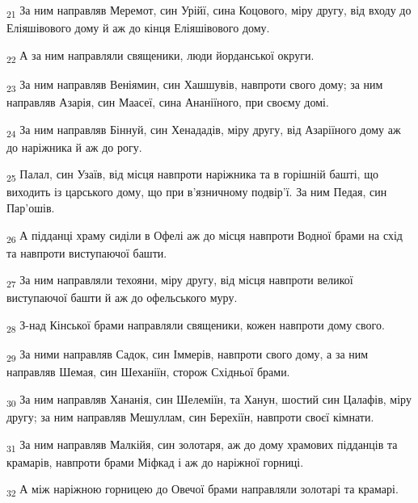 \begin{tcolorbox}
\textsubscript{21} За ним направляв Меремот, син Урійї, сина Коцового, міру другу, від входу до Еліяшівового дому й аж до кінця Еліяшівового дому.
\end{tcolorbox}
\begin{tcolorbox}
\textsubscript{22} А за ним направляли священики, люди йорданської округи.
\end{tcolorbox}
\begin{tcolorbox}
\textsubscript{23} За ним направляв Веніямин, син Хашшувів, навпроти свого дому; за ним направляв Азарія, син Маасеї, сина Ананіїного, при своєму домі.
\end{tcolorbox}
\begin{tcolorbox}
\textsubscript{24} За ним направляв Біннуй, син Хенададів, міру другу, від Азаріїного дому аж до наріжника й аж до рогу.
\end{tcolorbox}
\begin{tcolorbox}
\textsubscript{25} Палал, син Узаїв, від місця навпроти наріжника та в горішній башті, що виходить із царського дому, що при в'язничному подвір'ї. За ним Педая, син Пар'ошів.
\end{tcolorbox}
\begin{tcolorbox}
\textsubscript{26} А підданці храму сиділи в Офелі аж до місця навпроти Водної брами на схід та навпроти виступаючої башти.
\end{tcolorbox}
\begin{tcolorbox}
\textsubscript{27} За ним направляли техояни, міру другу, від місця навпроти великої виступаючої башти й аж до офельського муру.
\end{tcolorbox}
\begin{tcolorbox}
\textsubscript{28} З-над Кінської брами направляли священики, кожен навпроти дому свого.
\end{tcolorbox}
\begin{tcolorbox}
\textsubscript{29} За ними направляв Садок, син Іммерів, навпроти свого дому, а за ним направляв Шемая, син Шеханіїн, сторож Східньої брами.
\end{tcolorbox}
\begin{tcolorbox}
\textsubscript{30} За ним направляв Хананія, син Шелеміїн, та Ханун, шостий син Цалафів, міру другу; за ним направляв Мешуллам, син Берехіїн, навпроти своєї кімнати.
\end{tcolorbox}
\begin{tcolorbox}
\textsubscript{31} За ним направляв Малкійя, син золотаря, аж до дому храмових підданців та крамарів, навпроти брами Міфкад і аж до наріжної горниці.
\end{tcolorbox}
\begin{tcolorbox}
\textsubscript{32} А між наріжною горницею до Овечої брами направляли золотарі та крамарі.
\end{tcolorbox}
